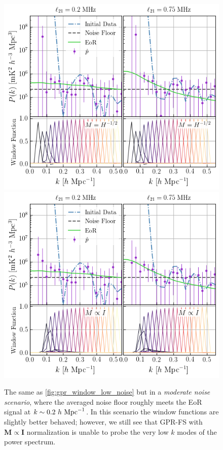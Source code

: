\documentclass[a4paper,fleqn,usenatbib]{mnras}
\def\M{\boldsymbol{M}}
\def\I{\boldsymbol{I}}
\begin{document}
\begin{figure}
\centering
\includegraphics[scale=0.6]{imgs/gpr_window_med_noise_M_F12}
\includegraphics[scale=0.6]{imgs/gpr_window_med_noise_M_I}
\caption{The same as \autoref{fig:gpr_window_low_noise} but in a \emph{moderate noise scenario}, where the averaged noise floor roughly meets the EoR signal at $k\sim0.2\ h\ {\rm Mpc}^{-1}$.
In this scenario the window functions are slightly better behaved; however, we still see that GPR-FS with $\M\propto\I$ normalization is unable to probe the very low $k$ modes of the power spectrum.}
\label{fig:gpr_window_med_noise}
\end{figure}
\end{document}
